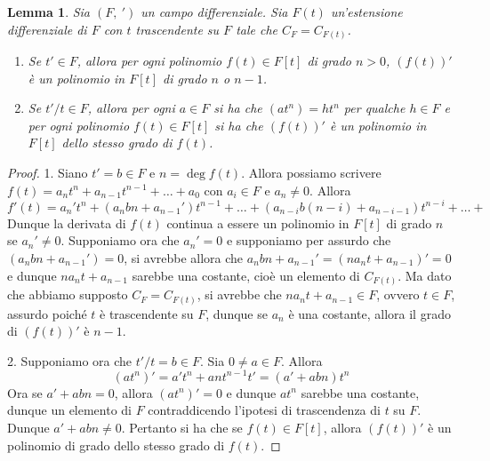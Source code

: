\documentclass[10pt,oneside]{article}
\theoremstyle{definition}
\theoremstyle{plain}
\theoremstyle{definition}
\theoremstyle{plain}
\theoremstyle{plain}
\newtheorem{lemma}{Lemma}
\begin{document}
\begin{lemma}\label{lemma:utilerperliov} Sia $(F,\ ')$ un campo differenziale. Sia $F(t)$ un'estensione differenziale di $F$ con $t$ trascendente su $F$ tale che $C_F=C_{F(t)}$. 
\begin{enumerate}

\item Se $t' \in F$, allora per ogni polinomio $f(t) \in F[t]$ di grado $n >0$, $(f(t))'$ è un polinomio in $F[t]$ di grado $n$ o $n-1$.
\item Se $ t'/t \in F$, allora per ogni $a \in F$ si ha che $(at^n)=ht^n$ per qualche $h \in F$ e per ogni polinomio $f(t) \in F[t]$ si ha che $(f(t))'$ è un polinomio in $F[t]$ dello stesso grado di $f(t)$.

\end{enumerate}
\end{lemma}
\begin{proof}
1. Siano $t'=b \in F$ e $n=\deg f(t)$. Allora possiamo scrivere $f(t)=a_nt^n+a_{n-1}t^{n-1}+\dots+a_0$ con $a_i \in F$ e $a_n \neq 0$. Allora
\[f'(t)= a_n't^n + (a_nbn+a_{n-1}')t^{n-1} + \dots + (a_{n-i}b(n-i)+a_{n-i-1})t^{n-i}+ \dots +  \]
Dunque la derivata di $f(t)$ continua a essere un polinomio in $F[t]$ di grado $n$ se $a_n' \neq 0$. Supponiamo ora che $a_n'=0$ e supponiamo per assurdo che $(a_nbn+a_{n-1}')=0$, si avrebbe allora che  $a_nbn+a_{n-1}'=(na_nt+a_{n-1})'=0$  e dunque $na_nt+a_{n-1}$ sarebbe una costante, cioè un elemento di $C_{F(t)}$. Ma dato che abbiamo supposto $C_F=C_{F(t)}$, si avrebbe che $na_nt+a_{n-1} \in F$, ovvero $t \in F$, assurdo poiché $t$ è trascendente su $F$, dunque se $a_n$ è una costante, allora il grado di $(f(t))'$ è $n-1$.

2. Supponiamo ora che $t'/t =b \in F$. Sia $0\neq a \in F$. Allora
\[(at^n)'=a't^n+ant^{n-1}t'=(a'+abn)t^n \]
Ora se $a'+abn=0$, allora $(at^n)'=0$ e dunque $at^n$ sarebbe una costante, dunque un elemento di $F$ contraddicendo l'ipotesi di trascendenza di $t$ su $F$. Dunque $a'+abn \neq 0$. Pertanto si ha che se $f(t) \in F[t]$, allora $(f(t))'$ è un polinomio di grado dello stesso grado di $f(t)$.



\end{proof}
\end{document}
